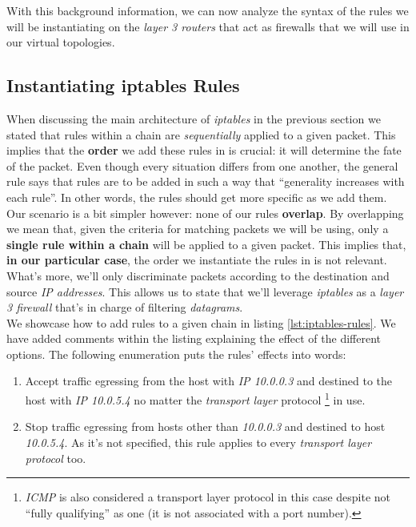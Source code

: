             With this background information, we can now analyze the syntax of the rules we will be instantiating on the \textit{layer 3 routers} that act as firewalls that we will use in our virtual topologies.\\

        \subsection{Instantiating iptables Rules}
            When discussing the main architecture of \textit{iptables} in the previous section we stated that rules within a chain are \textit{sequentially} applied to a given packet. This implies that the \textbf{order} we add these rules in is crucial: it will determine the fate of the packet. Even though every situation differs from one another, the general rule says that rules are to be added in such a way that ``generality increases with each rule''. In other words, the rules should get more specific as we add them.\\

            Our scenario is a bit simpler however: none of our rules \textbf{overlap}. By overlapping we mean that, given the criteria for matching packets we will be using, only a \textbf{single rule within a chain} will be applied to a given packet. This implies that, \textbf{in our particular case}, the order we instantiate the rules in is not relevant. What's more, we'll only discriminate packets according to the destination and source \textit{IP addresses}. This allows us to state that we'll leverage \textit{iptables} as a \textit{layer 3 firewall} that's in charge of filtering \textit{datagrams}.\\

            We showcase how to add rules to a given chain in listing \ref{lst:iptables-rules}. We have added comments within the listing explaining the effect of the different options. The following enumeration puts the rules' effects into words:\\

            \begin{enumerate}
                \item Accept traffic egressing from the host with \textit{IP 10.0.0.3} and destined to the host with \textit{IP 10.0.5.4} no matter the \textit{transport layer} protocol \footnote{\textit{ICMP} is also considered a transport layer protocol in this case despite not ``fully qualifying'' as one (it is not associated with a port number).} in use.
                \item Stop traffic egressing from hosts other than \textit{10.0.0.3} and destined to host \textit{10.0.5.4}. As it's not specified, this rule applies to every \textit{transport layer protocol} too.
            \end{enumerate}

